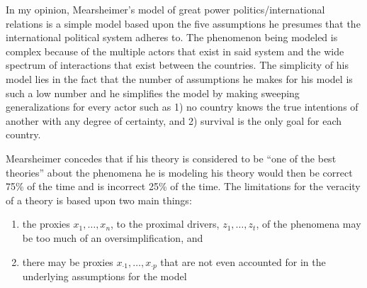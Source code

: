 \documentclass[12pt]{article}
\begin{document}
\begin{enumerate}
 

\begin{tcolorbox}[colback=white, sharp corners]

In my opinion, Mearsheimer's model of great power politics/international relations is a simple model based upon the five assumptions he presumes that the international political system adheres to. The phenomenon being modeled is complex because of the multiple actors that exist in said system and the wide spectrum of interactions that exist between the countries. The simplicity of his model lies in the fact that the number of assumptions he makes for his model is such a low number and he simplifies the model by making sweeping generalizations for every actor such as 1) no country knows the true intentions of another with any degree of certainty, and 2) survival is the only goal for each country. 

\end{tcolorbox}

 

\begin{tcolorbox}[colback=white, sharp corners]

Mearsheimer concedes that if his theory is considered to be ``one of the best theories'' about the phenomena he is modeling his theory would then be correct 75\% of the time and is incorrect 25\% of the time.  The limitations for the veracity of a theory is based upon two main things:

\begin{enumerate}
 \item[1)] the proxies $x_1, \ldots, x_n$, to the proximal drivers, $z_1, \ldots, z_t$, of the phenomena may be too much of an oversimplification, and 
 \item[2)] there may be proxies $x_{\cdot 1}, \ldots, x_{\cdot p}$ that are not even accounted for in the underlying assumptions for the model 
 \end{enumerate}

\end{tcolorbox}

\end{enumerate}
\end{document}
